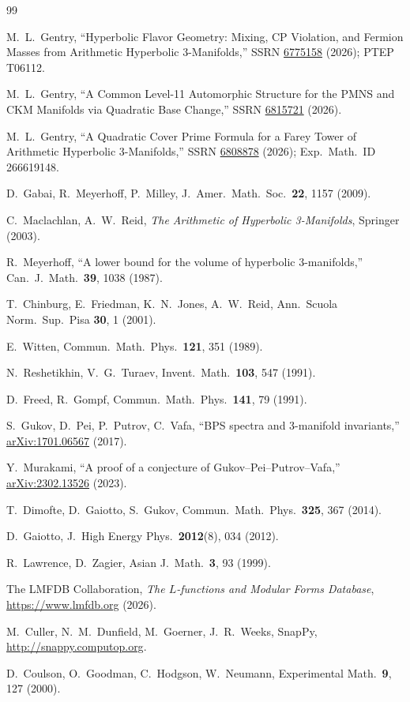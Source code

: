 \documentclass[11pt,a4paper]{article}
\theoremstyle{definition}
\begin{document}
\begin{thebibliography}{99}

M.~L.~Gentry,
``Hyperbolic Flavor Geometry: Mixing, CP Violation, and Fermion
Masses from Arithmetic Hyperbolic 3-Manifolds,''
SSRN \href{https://doi.org/10.2139/ssrn.6775158}{6775158} (2026);
PTEP T06112.

M.~L.~Gentry,
``A Common Level-11 Automorphic Structure for the PMNS and CKM
Manifolds via Quadratic Base Change,''
SSRN \href{https://doi.org/10.2139/ssrn.6815721}{6815721} (2026).

M.~L.~Gentry,
``A Quadratic Cover Prime Formula for a Farey Tower of Arithmetic
Hyperbolic 3-Manifolds,''
SSRN \href{https://doi.org/10.2139/ssrn.6808878}{6808878} (2026);
Exp.\ Math.\ ID 266619148.

D.~Gabai, R.~Meyerhoff, P.~Milley,
J.\ Amer.\ Math.\ Soc.\ \textbf{22}, 1157 (2009).

C.~Maclachlan, A.~W.~Reid,
\emph{The Arithmetic of Hyperbolic 3-Manifolds}, Springer (2003).

R.~Meyerhoff,
``A lower bound for the volume of hyperbolic 3-manifolds,''
Can.\ J.\ Math.\ \textbf{39}, 1038 (1987).

T.~Chinburg, E.~Friedman, K.~N.~Jones, A.~W.~Reid,
Ann.\ Scuola Norm.\ Sup.\ Pisa \textbf{30}, 1 (2001).

E.~Witten,
Commun.\ Math.\ Phys.\ \textbf{121}, 351 (1989).

N.~Reshetikhin, V.~G.~Turaev,
Invent.\ Math.\ \textbf{103}, 547 (1991).

D.~Freed, R.~Gompf,
Commun.\ Math.\ Phys.\ \textbf{141}, 79 (1991).

S.~Gukov, D.~Pei, P.~Putrov, C.~Vafa,
``BPS spectra and 3-manifold invariants,''
\href{https://arxiv.org/abs/1701.06567}{arXiv:1701.06567} (2017).

Y.~Murakami,
``A proof of a conjecture of Gukov--Pei--Putrov--Vafa,''
\href{https://arxiv.org/abs/2302.13526}{arXiv:2302.13526} (2023).

T.~Dimofte, D.~Gaiotto, S.~Gukov,
Commun.\ Math.\ Phys.\ \textbf{325}, 367 (2014).

D.~Gaiotto,
J.\ High Energy Phys.\ \textbf{2012}(8), 034 (2012).

R.~Lawrence, D.~Zagier,
Asian J.\ Math.\ \textbf{3}, 93 (1999).

The LMFDB Collaboration,
\emph{The $L$-functions and Modular Forms Database},
\url{https://www.lmfdb.org} (2026).

M.~Culler, N.~M.~Dunfield, M.~Goerner, J.~R.~Weeks,
SnapPy, \url{http://snappy.computop.org}.

D.~Coulson, O.~Goodman, C.~Hodgson, W.~Neumann,
Experimental Math.\ \textbf{9}, 127 (2000).

\end{thebibliography}
\end{document}
